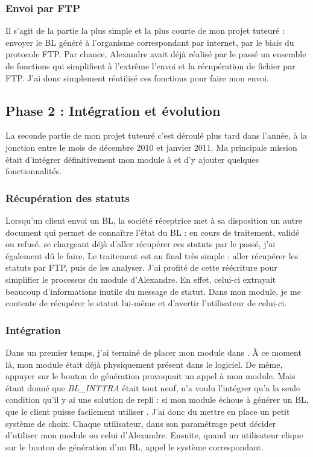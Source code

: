 \subsubsection{Envoi par FTP}
Il s'agit de la partie la plus simple et la plus courte de mon projet tuteuré : envoyer le BL généré à l'organisme correspondant par internet, par le biais du protocole FTP. Par chance, Alexandre avait déjà réalisé par le passé un ensemble de fonctions qui simplifient à l'extrême l'envoi et la récupération de fichier par FTP. J'ai donc simplement réutilisé ces fonctions pour faire mon envoi.

\subsection{Phase 2 : Intégration et évolution}
La seconde partie de mon projet tuteuré c'est déroulé plus tard dans l'année, à la jonction entre le mois de décembre 2010 et janvier 2011. Ma principale mission était d'intégrer définitivement mon module à \integrale{} et d'y ajouter quelques fonctionnalités.

\subsubsection{Récupération des statuts}
Lorsqu'un client envoi un BL, la société réceptrice met à sa disposition un autre document qui permet de connaître l'état du BL : en cours de traitement, validé ou refusé. \pireus{} se chargeant déjà d'aller récupérer ces statuts par le passé, j'ai également dû le faire. Le traitement est au final très simple : aller récupérer les statuts par FTP, puis de les analyser. J'ai profité de cette réécriture pour simplifier le processus du module d'Alexandre. En effet, celui-ci extrayait beaucoup d'informations inutile du message de statut. Dans mon module, je me contente de récupérer le statut lui-même et d'avertir l'utilisateur de celui-ci.

\subsubsection{Intégration}
Dans un premier temps, j'ai terminé de placer mon module dans \integrale. À ce moment là, mon module était déjà physiquement présent dans le logiciel. De même, appuyer sur le bouton de génération provoquait un appel à mon module. Mais étant donné que \emph{BL\_INTTRA} était tout neuf, \solulog{} n'a voulu l'intégrer qu'a la seule condition qu'il y ai une solution de repli : si mon module échoue à générer un BL, que le client puisse facilement utiliser \pireus. J'ai donc du mettre en place un petit système de choix. Chaque utilisateur, dans son paramétrage peut décider d'utiliser mon module ou celui d'Alexandre. Ensuite, quand un utilisateur clique sur le bouton de génération d'un BL, \integrale{} appel le système correspondant.


